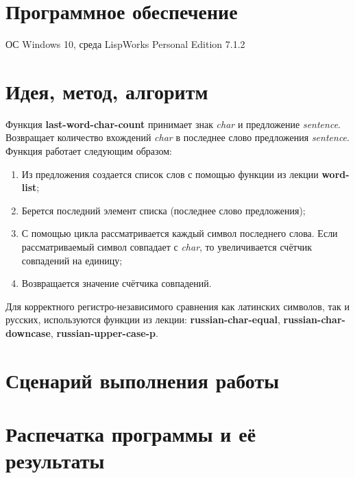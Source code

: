 \documentclass[12pt]{article}
\begin{document}
\section{Программное обеспечение}
ОС Windows 10, среда LispWorks Personal Edition 7.1.2

\section{Идея, метод, алгоритм}

Функция \textbf{last-word-char-count} принимает знак \textit{char} и предложение \textit{sentence}. Возвращает количество вхождений \textit{char} в последнее слово предложения \textit{sentence}. Функция работает следующим образом:

\begin{enumerate}
    \item Из предложения создается список слов с помощью функции из лекции \textbf{word-list};
    \item Берется последний элемент списка (последнее слово предложения);
    \item С помощью цикла рассматривается каждый символ последнего слова. Если рассматриваемый символ совпадает с \textit{char}, то увеличивается счётчик совпадений на единицу;
    \item Возвращается значение счётчика совпадений.
\end{enumerate}

Для корректного регистро-независимого сравнения как латинских символов, так и русских, используются функции из лекции: \textbf{russian-char-equal}, \textbf{russian-char-downcase}, \textbf{russian-upper-case-p}.

\section{Сценарий выполнения работы}

\section{Распечатка программы и её результаты}
\end{document}
